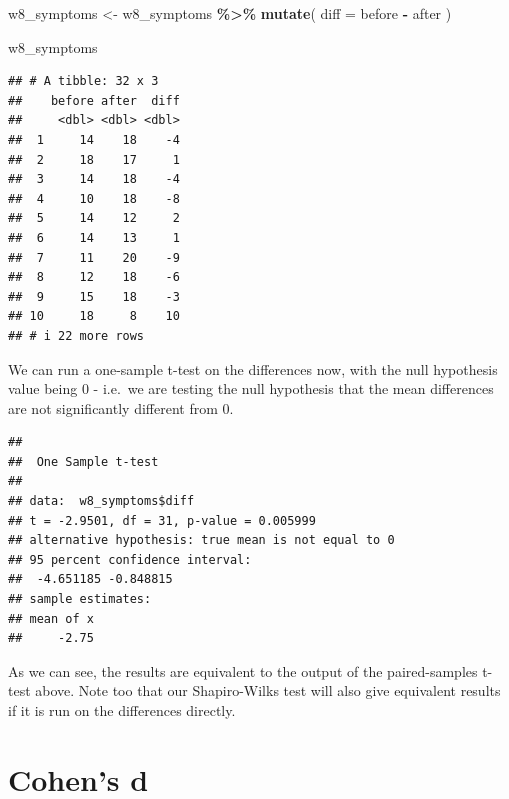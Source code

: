 \documentclass[
]{book}
\newenvironment{Shaded}{\begin{snugshade}}{\end{snugshade}}
\newcommand{\AttributeTok}[1]{\textcolor[rgb]{0.13,0.29,0.53}{#1}}
\newcommand{\DecValTok}[1]{\textcolor[rgb]{0.00,0.00,0.81}{#1}}
\newcommand{\FunctionTok}[1]{\textcolor[rgb]{0.13,0.29,0.53}{\textbf{#1}}}
\newcommand{\NormalTok}[1]{#1}
\newcommand{\OtherTok}[1]{\textcolor[rgb]{0.56,0.35,0.01}{#1}}
\newcommand{\SpecialCharTok}[1]{\textcolor[rgb]{0.81,0.36,0.00}{\textbf{#1}}}
\begin{document}
\begin{Shaded}
\begin{Highlighting}[]
\NormalTok{w8\_symptoms }\OtherTok{\textless{}{-}}\NormalTok{ w8\_symptoms }\SpecialCharTok{\%\textgreater{}\%}
  \FunctionTok{mutate}\NormalTok{(}
    \AttributeTok{diff =}\NormalTok{ before }\SpecialCharTok{{-}}\NormalTok{ after}
\NormalTok{  )}

\NormalTok{w8\_symptoms}
\end{Highlighting}
\end{Shaded}

\begin{verbatim}
## # A tibble: 32 x 3
##    before after  diff
##     <dbl> <dbl> <dbl>
##  1     14    18    -4
##  2     18    17     1
##  3     14    18    -4
##  4     10    18    -8
##  5     14    12     2
##  6     14    13     1
##  7     11    20    -9
##  8     12    18    -6
##  9     15    18    -3
## 10     18     8    10
## # i 22 more rows
\end{verbatim}

We can run a one-sample t-test on the differences now, with the null hypothesis value being 0 - i.e.~we are testing the null hypothesis that the mean differences are not significantly different from 0.

\begin{Shaded}
\end{Shaded}

\begin{verbatim}
## 
##  One Sample t-test
## 
## data:  w8_symptoms$diff
## t = -2.9501, df = 31, p-value = 0.005999
## alternative hypothesis: true mean is not equal to 0
## 95 percent confidence interval:
##  -4.651185 -0.848815
## sample estimates:
## mean of x 
##     -2.75
\end{verbatim}

As we can see, the results are equivalent to the output of the paired-samples t-test above. Note too that our Shapiro-Wilks test will also give equivalent results if it is run on the differences directly.

\section{Cohen's d}\label{cohens-d}
\end{document}
